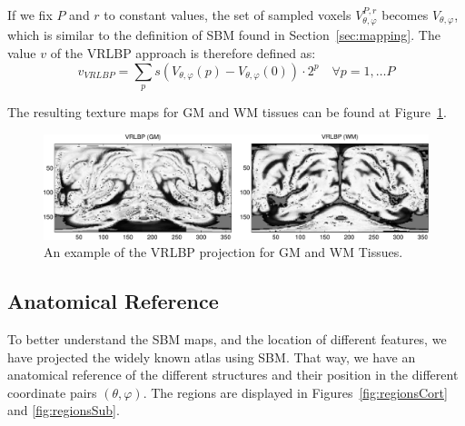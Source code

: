 If we fix $P$ and $r$ to constant values, the set of sampled voxels $V_{\theta,\varphi}^{P,r}$ becomes $V_{\theta,\varphi}$, which is similar to the definition of \ac{SBM} found in Section~\ref{sec:mapping}. The value $v$ of the \ac{VRLBP} approach is therefore defined as: 
\begin{equation}
v_{VRLBP} = \sum_{p} s(V_{\theta,\varphi}(p)-V_{\theta,\varphi}(0))\cdot 2^{p} \quad \forall p=1,\dots P
\end{equation}

The resulting texture maps for \ac{GM} and \ac{WM} tissues can be found at Figure~\ref{fig:vrlbp}. 

\begin{figure}[htp]
	\centering
	\includegraphics[width=\textwidth]{Graphics/ch6/04-vrlbp}
	\caption{An example of the \acs{VRLBP} projection for \acs{GM} and \acs{WM} Tissues. }
	\label{fig:vrlbp}
\end{figure}

%	
%	

\subsection{Anatomical Reference}\label{sec:anatomical}
To better understand the \ac{SBM} maps, and the location of different features, we have projected the widely known \cite{AAL} atlas \cite{Tzourio-Mazoyer2002} using \ac{SBM}. That way, we have an anatomical reference of the different structures and their position in the different coordinate pairs $(\theta,\varphi)$. The regions are displayed in  Figures~\ref{fig:regionsCort} and \ref{fig:regionsSub}. 

